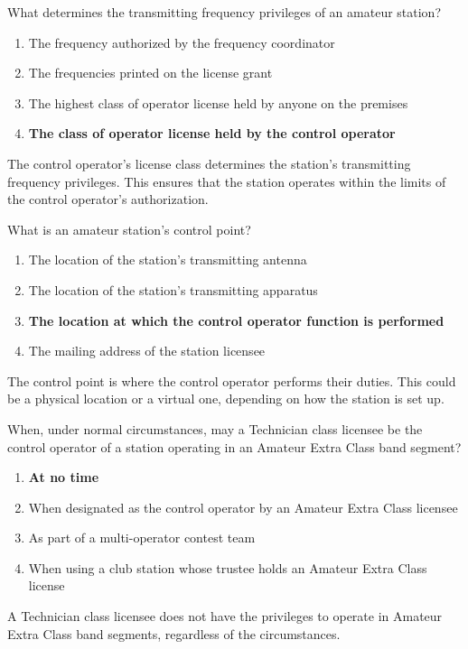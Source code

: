 \begin{tcolorbox}[colback=gray!10!white,colframe=black!75!black,title={T1E04}]
    What determines the transmitting frequency privileges of an amateur station?
    \begin{enumerate}[label=\Alph*),noitemsep]
        \item The frequency authorized by the frequency coordinator
        \item The frequencies printed on the license grant
        \item The highest class of operator license held by anyone on the premises
        \item \textbf{The class of operator license held by the control operator}
    \end{enumerate}
\end{tcolorbox}
The control operator's license class determines the station's transmitting frequency privileges. This ensures that the station operates within the limits of the control operator's authorization.

\begin{tcolorbox}[colback=gray!10!white,colframe=black!75!black,title={T1E05}]
    What is an amateur station’s control point?
    \begin{enumerate}[label=\Alph*),noitemsep]
        \item The location of the station’s transmitting antenna
        \item The location of the station’s transmitting apparatus
        \item \textbf{The location at which the control operator function is performed}
        \item The mailing address of the station licensee
    \end{enumerate}
\end{tcolorbox}
The control point is where the control operator performs their duties. This could be a physical location or a virtual one, depending on how the station is set up.

\begin{tcolorbox}[colback=gray!10!white,colframe=black!75!black,title={T1E06}]
    When, under normal circumstances, may a Technician class licensee be the control operator of a station operating in an Amateur Extra Class band segment?
    \begin{enumerate}[label=\Alph*),noitemsep]
        \item \textbf{At no time}
        \item When designated as the control operator by an Amateur Extra Class licensee
        \item As part of a multi-operator contest team
        \item When using a club station whose trustee holds an Amateur Extra Class license
    \end{enumerate}
\end{tcolorbox}
A Technician class licensee does not have the privileges to operate in Amateur Extra Class band segments, regardless of the circumstances.

